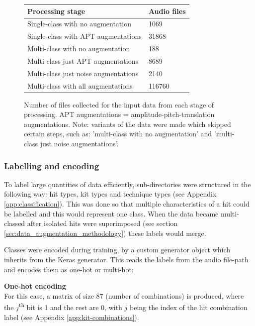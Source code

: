 \documentclass[12pt]{article}
\begin{document}
    \begin{figure}[H]
        \centering
        \begin{tabular}{l|l}
            Processing stage & Audio files\\
            \hline
            Single-class with no augmentation & 1069\\
            Single-class with APT augmentations & 31868\\
            Multi-class with no augmentation & 188\\
            Multi-class just APT augmentations & 8689\\
            Multi-class just noise augmentations & 2140\\
            Multi-class with all augmentations & 116760\\\bottomrule
        \end{tabular}
    \caption{\footnotesize{Number of files collected for the input data from each stage of processing. APT augmentations = amplitude-pitch-translation augmentations. Note: variants of the data were made which skipped certain steps, such as: 'multi-class with no augmentation' and 'multi-class just noise augmentations'.}}
    \label{fig:data_origin_table}
    \end{figure}
    
    \subsubsection{Labelling and encoding}
    \label{sec:labelling_and_encoding}
    To label large quantities of data efficiently, sub-directories were structured in the following way: hit types, kit types and technique types (see Appendix \ref{app:classification}). This was done so that multiple characteristics of a hit could be labelled and this would represent one class. When the data became multi-classed after isolated hits were superimposed (see section \ref{sec:data_augmentation_methodology}) these labels would merge.\medskip
    
    Classes were encoded during training, by a custom generator object which inherits from the Keras generator. This reads the labels from the audio file-path and encodes them as one-hot or multi-hot:\medskip
    
    \textbf{One-hot encoding}\\
    For this case, a matrix of size 87 (number of combinations) is produced, where the $j$\textsuperscript{th} bit is 1 and the rest are 0, with $j$ being the index of the hit combination label (see Appendix \ref{app:kit-combinations}).\medskip
    
\end{document}
